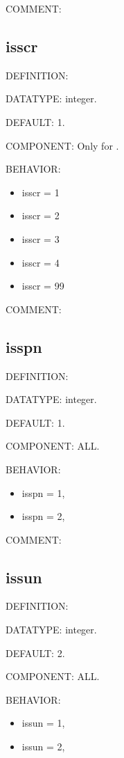 {\color{olive}COMMENT:}

\subsection{isscr\label{subsec:isscr}}
{\color{red}DEFINITION:}

{\color{green}DATATYPE:} integer.

{\color{blue}DEFAULT:} 1.

{\color{brown}COMPONENT:} Only for {\narcissus}.

{\color{purple}BEHAVIOR:}
\begin{itemize}
\item isscr = 1
\item isscr = 2
\item isscr = 3
\item isscr = 4
\item isscr = 99
\end{itemize}

{\color{olive}COMMENT:}

\subsection{isspn}
{\color{red}DEFINITION:}

{\color{green}DATATYPE:} integer.

{\color{blue}DEFAULT:} 1.

{\color{brown}COMPONENT:} ALL.

{\color{purple}BEHAVIOR:}
\begin{itemize}
\item isspn = 1,
\item isspn = 2,
\end{itemize}

{\color{olive}COMMENT:}

\subsection{issun}
{\color{red}DEFINITION:}

{\color{green}DATATYPE:} integer.

{\color{blue}DEFAULT:} 2.

{\color{brown}COMPONENT:} ALL.

{\color{purple}BEHAVIOR:}
\begin{itemize}
\item issun = 1,
\item issun = 2,
\end{itemize}

